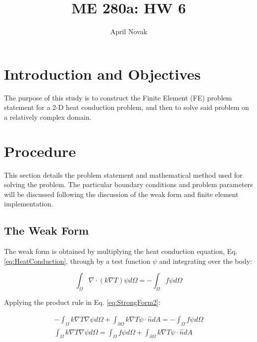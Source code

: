 \documentclass[10pt]{article}
\begin{document}
\title{ME 280a: HW 6}
\author{April Novak}

\maketitle

\section{Introduction and Objectives}

The purpose of this study is to construct the Finite Element (FE) problem statement for a 2-D heat conduction problem, and then to solve said problem on a relatively complex domain.

\section{Procedure}
\label{sec:Procedure}

This section details the problem statement and mathematical method used for solving the problem. The particular boundary conditions and problem parameters will be discussed following the discussion of the weak form and finite element implementation.

\subsection{The Weak Form}

The weak form is obtained by multiplying the heat conduction equation, Eq. \eqref{eq:HeatConduction}, through by a test function \(\psi\) and integrating over the body:

\begin{equation}
\label{eq:StrongForm2}
\int_{\Omega}\nabla\cdot(k\nabla T)\psi d\Omega=-\int_{\Omega}f\psi d\Omega
\end{equation}

Applying the product rule in Eq. \eqref{eq:StrongForm2}:

\begin{equation}
\begin{aligned}
-\int_{\Omega}k\nabla T\nabla\psi d\Omega+\int_{\partial\Omega}k\nabla T\psi\cdot\hat{n}dA=-\int_{\Omega}f\psi d\Omega\\
\int_{\Omega}k\nabla T\nabla\psi d\Omega=\int_{\Omega}f\psi d\Omega+\int_{\partial\Omega}k\nabla T\psi\cdot\hat{n}dA\\
\end{aligned}
\end{equation}
\end{document}
